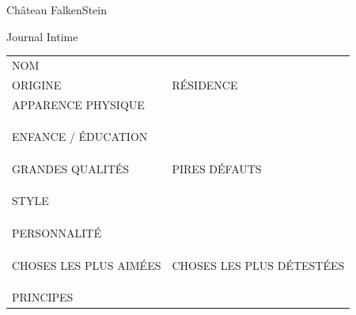 \documentclass[a5paper]{letter}
\begin{document}



{\centering \Huge{Château FalkenStein}~\\
{\centering \large{Journal Intime}~\\



\begin{tabular}[c]{ p{} p{} }
	NOM						&									\\
	ORIGINE					&		RÉSIDENCE					\\
	APPARENCE PHYSIQUE		&									\\
							&									\\
							&									\\
							&									\\
	ENFANCE / ÉDUCATION		&									\\
							&									\\
							&									\\
							&									\\
	GRANDES QUALITÉS		&		PIRES DÉFAUTS				\\
							&									\\
							&									\\
							&									\\
	STYLE					&									\\
							&									\\
							&									\\
							&									\\
	PERSONNALITÉ			&									\\
							&									\\
							&									\\
							&									\\
	CHOSES LES PLUS AIMÉES	&		CHOSES LES PLUS DÉTESTÉES	\\
							&									\\
							&									\\
							&									\\
	PRINCIPES				&									\\

\end{tabular}}}
\end{document}
